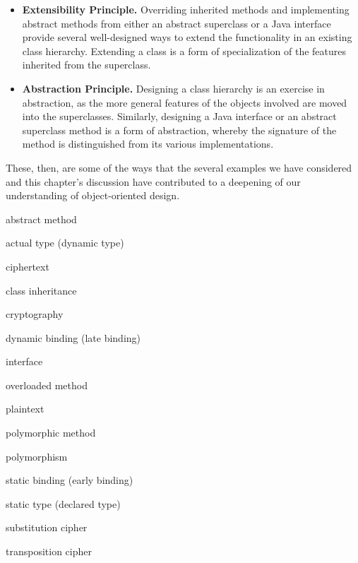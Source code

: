 \begin{itemize}
\item {\bf Extensibility Principle.}  Overriding inherited methods and
implementing abstract methods from either an abstract superclass or a
Java interface provide several well-designed ways to extend the
functionality in an existing class hierarchy. Extending a class is a
form of specialization of the features inherited from the superclass.

\item {\bf Abstraction Principle.} Designing a class hierarchy is an
exercise in abstraction, as the more general features of the objects
involved are moved into the superclasses. Similarly, designing a Java
interface or an abstract superclass method is a form of abstraction,
whereby the signature of the method is distinguished from its various
implementations. 

\end{itemize}

These, then, are some of the ways that the several examples we have
considered and this chapter's discussion have contributed
to a deepening of our understanding of object-oriented design.

\pagebreak
{} 

\begin{KT}
abstract method

actual type (dynamic type)

ciphertext

class inheritance 

cryptography

dynamic binding (late binding)

interface

overloaded method

plaintext

polymorphic method

polymorphism 

static binding (early binding)

static type (declared type)

substitution cipher

transposition cipher

\end{KT}


